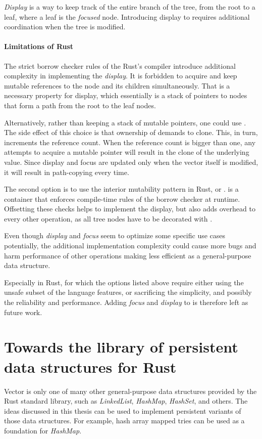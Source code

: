 \emph{Display} is a way to keep track of the entire branch of the tree, from the root to a leaf, where a leaf is the \emph{focused} node. Introducing display to \rrbtree{} requires additional coordination when the tree is modified.

\paragraph{Limitations of Rust}
The strict borrow checker rules of the Rust's compiler introduce additional complexity in implementing the \emph{display}. It is forbidden to acquire and keep mutable references to the node and its children simultaneously. That is a necessary property for display, which essentially is a stack of pointers to nodes that form a path from the root to the leaf nodes.

Alternatively, rather than keeping a stack of mutable pointers, one could use \rc{}. The side effect of this choice is that ownership of \rc{} demands to clone. This, in turn, increments the reference count. When the reference count is bigger than one, any attempts to acquire a mutable pointer will result in the clone of the underlying value. Since display and focus are updated only when the vector itself is modified, it will result in path-copying every time.

The second option is to use the interior mutability pattern in Rust, or .  is a container that enforces compile-time rules of the borrow checker at runtime. Offsetting these checks helps to implement the display, but also adds overhead to every other operation, as all tree nodes have to be decorated with .

Even though \emph{display} and \emph{focus} seem to optimize some specific use cases potentially, the additional implementation complexity could cause more bugs and harm performance of other operations making \rrbtree{} less efficient as a general-purpose data structure.

Especially in Rust, for which the options listed above require either using the unsafe subset of the language features, or sacrificing the simplicity, and possibly the reliability and performance. Adding \emph{focus} and \emph{display} to \rrbvec{} is therefore left as future work.

\section{Towards the library of persistent data structures for Rust}
Vector is only one of many other general-purpose data structures provided by the Rust standard library, such as \emph{LinkedList}, \emph{HashMap}, \emph{HashSet}, and others. The ideas discussed in this thesis can be used to implement persistent variants of those data structures. For example, hash array mapped tries\cite{ideal-hash-trees} can be used as a foundation for \emph{HashMap}.

